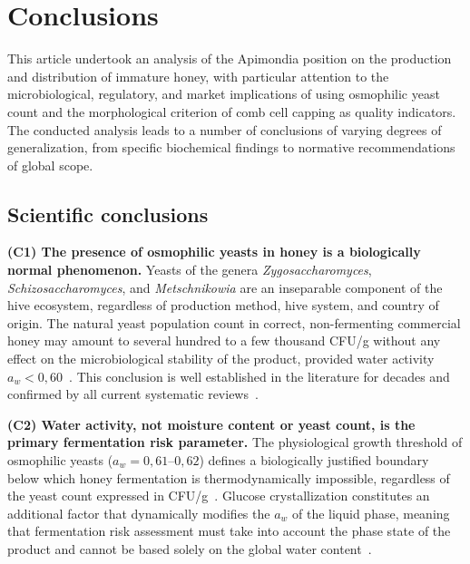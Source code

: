 
\section{Conclusions}

This article undertook an analysis of the Apimondia position
on the production and distribution of immature honey, with
particular attention to the microbiological, regulatory, and
market implications of using osmophilic yeast count and the
morphological criterion of comb cell capping as quality indicators.
The conducted analysis leads to a number of conclusions of varying
degrees of generalization, from specific biochemical findings
to normative recommendations of global scope.

\subsection{Scientific conclusions}

\textbf{(C1) The presence of osmophilic yeasts in honey is a biologically normal phenomenon.}
Yeasts of the genera \textit{Zygosaccharomyces}, \textit{Schizosaccharomyces},
and \textit{Metschnikowia} are an inseparable component of the hive
ecosystem, regardless of production method, hive system, and country
of origin. The natural yeast population count in correct, non-fermenting
commercial honey may amount to several hundred to a few thousand CFU/g
without any effect on the microbiological stability of the product,
provided water activity $a_w < 0{,}60$~\cite{ruegg1981}.
This conclusion is well established in the literature for decades
and confirmed by all current systematic
reviews~\cite{biochemreactions2022,rodriguezmachado2024}.

\textbf{(C2) Water activity, not moisture content or yeast count, is the primary fermentation risk parameter.}
The physiological growth threshold of osmophilic yeasts
($a_w = 0{,}61$--$0{,}62$) defines a biologically justified
boundary below which honey fermentation is thermodynamically
impossible, regardless of the yeast count expressed in
CFU/g~\cite{waaw2006,ruegg1981}.
Glucose crystallization constitutes an additional factor that
dynamically modifies the $a_w$ of the liquid phase, meaning that
fermentation risk assessment must take into account the phase state
of the product and cannot be based solely on the global water
content~\cite{zamora2006,ijfans2019}.

